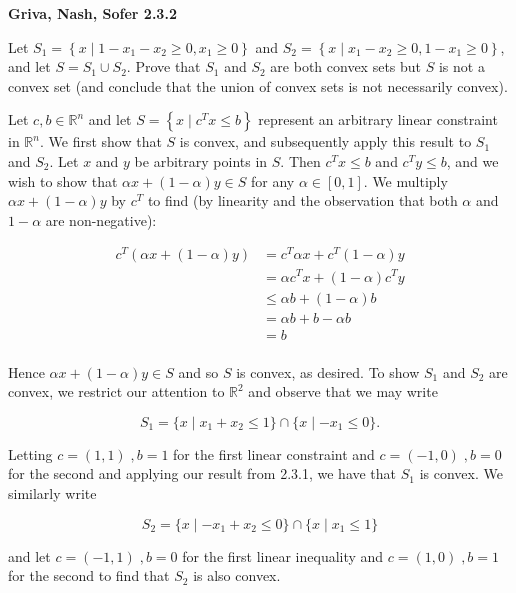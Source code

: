 \textbf{Griva, Nash, Sofer 2.3.2}

Let $S_1 = \left\{ x \mid 1 - x_1 - x_2 \ge 0, x_1 \ge 0 \right\}$ and 
$S_2 = \left\{ x \mid x_1 - x_2 \ge 0, 1 - x_1 \ge 0 \right\}$, and let $S = S_1 \cup S_2$.
Prove that $S_1$ and $S_2$ are both convex sets but $S$ is not a convex set (and conclude
that the union of convex sets is not necessarily convex).

\begin{solution}
  Let $c, b \in \mathbb{R}^n$ and let $S = \left\{ x \mid c^T x \le b \right\}$ represent an arbitrary linear constraint
  in $\mathbb{R}^n$. We first show that $S$ is convex, and subsequently apply this result to $S_1$ and $S_2$. Let $x$ 
  and $y$ be arbitrary points in $S$. Then $c^T x \le b$ and $c^T y \le b$, and we wish to show that 
  $\alpha x + (1 - \alpha) y \in S$ for any $\alpha \in [0, 1]$. We multiply $\alpha x + (1 - \alpha) y$ by $c^T$ to find 
  (by linearity and the observation that both $\alpha$ and $1 - \alpha$ are non-negative):

  \begin{align*}
    c^T \left(\alpha x + (1 - \alpha) y \right) &= c^T \alpha x + c^T (1 - \alpha) y \\
                                                &= \alpha c^T x + (1 - \alpha) c^T y \\
                                                &\le \alpha b + (1 - \alpha) b \\
                                                &= \alpha b + b - \alpha b \\
                                                &= b \\
  \end{align*}

  Hence $\alpha x + (1 - \alpha) y \in S$ and so $S$ is convex, as desired. To show $S_1$ and $S_2$ are convex, we restrict
  our attention to $\mathbb{R}^2$ and observe that we may write

  $$
  S_1 = \{x \mid x_1 + x_2 \le 1\} \cap \{ x \mid -x_1 \le 0 \}.
  $$

  Letting $c = (1, 1)\;, b = 1$ for the first linear constraint and $c = (-1, 0)\;, b = 0$ for the second and applying
  our result from 2.3.1, we have that $S_1$ is convex. We similarly write

  $$
  S_2 = \{x \mid -x_1 + x_2 \le 0\} \cap \{ x \mid x_1 \le 1 \}
  $$

  and let $c = (-1, 1)\;, b = 0$ for the first linear inequality and $c = (1, 0)\;, b = 1$ for the second to find that
  $S_2$ is also convex.


\end{solution}
